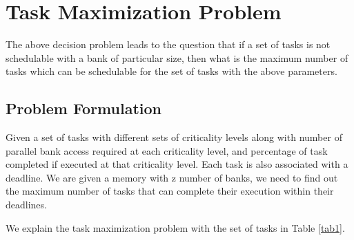 \section{Task Maximization Problem}\label{tmp}
The above decision problem leads to the question that if a set of tasks is not schedulable with a bank of particular size, 
then what is the maximum number of tasks which can be schedulable for the set of tasks with the above parameters.

\subsection{Problem Formulation}\label{pf}
\begin{problem}
Given a set of tasks with different sets of criticality levels along with number of parallel bank access required at each 
criticality level, and percentage of task completed if executed at that criticality level. Each task is also associated with 
a deadline. We are given a memory with z number of banks, we need to find out the maximum number of tasks that can complete 
their execution within their deadlines. 
\end{problem}
We explain the task maximization problem with the set of tasks in Table \ref{tab1}. 
% 
% 
% 
